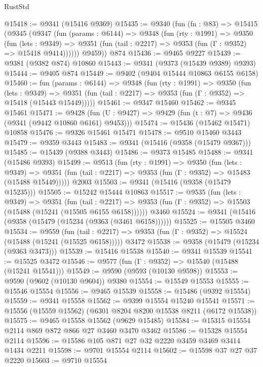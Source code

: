 \begin{lexlean}{RustStd}
\begin{coremodule}
@15418 := @9341 (@15416 @9369)
@15435 := @9340
    (fun (fn : @83) =>
    @15415
      (@9345
        (@9347
          (fun (params : @6144) =>
          @9348
            (fun (rty : @1991) =>
            @9350
              (fun (lets : @9349) =>
              @9351 (fun (tail : @2217) => @9353 (fun (Γ : @9352) => @15418 @9414))))))
        @9459))
    @874
@15436 := @9465 @9227
@15439 := @9381 (@9382 @874) @10860
@15443 := @9341 (@9373 (@15439 @9389) @9393)
@15444 := @9405 @874
@15449 := @9402 (@9404 @15444 @10863 @6155 @6158)
@15460 := fun (params : @6144) =>
  @9348
    (fun (rty : @1991) =>
    @9350
      (fun (lets : @9349) =>
      @9351 (fun (tail : @2217) => @9353 (fun (Γ : @9352) => @15418 (@15443 @15449)))))
@15461 := @9347 @15460
@15462 := @9345 @15461
@15471 := @9428
    (fun (U : @9427) => @9429 (fun (t : @7) => @9436 (@9341 (@9442 @10860 @6161) @9453)))
@15474 := @15436 (@15462 @15471) @10858
@15476 := @9326 @15461 @15471
@15478 := @9510 @15460 @3443
@15479 := @9359 @3443
@15483 := @9341 (@15416 (@9358 (@15479 @9367)))
@15485 := @15439 (@9388 @3443)
@15486 := @9373 @15485
@15488 := @9341 (@15486 @9393)
@15499 := @9513
    (fun (rty : @1991) =>
    @9350
      (fun (lets : @9349) =>
      @9351 (fun (tail : @2217) => @9353 (fun (Γ : @9352) => @15483 (@15488 @15449)))))
    @2003
@15503 := @9341 (@15416 (@9358 (@15479 @15235)))
@15505 := @15242 @15444 @10863
@15517 := @9535
    (fun (lets : @9349) =>
    @9351
      (fun (tail : @2217) =>
      @9353 (fun (Γ : @9352) => @15503 (@15488 (@15241 (@15505 @6155 @6158))))))
    @3460
@15524 := @9341 (@15416 (@9358 (@15479 (@15234 (@9363 (@3461 @6158))))))
@15525 := @15505 @3460
@15534 := @9559
    (fun (tail : @2217) => @9353 (fun (Γ : @9352) => @15524 (@15488 (@15241 (@15525 @6158)))))
    @3472
@15538 := @9358 (@15479 (@15234 (@9363 @3473)))
@15539 := @15416 @15538
@15540 := @9341 @15539
@15541 := @15525 @3472
@15546 := @9577 (fun (Γ : @9352) => @15540 (@15488 (@15241 @15541)))
@15549 := @9590 (@9593 (@10130 @9598))
@15553 := @9590 (@9602 (@10130 @9604)) @9380
@15554 := @15549 @15553
@15555 := @15546 @15554
@15556 := @9465 @15539
@15558 := @15486 (@9392 @15554)
@15559 := @9341 @15558
@15562 := @9399 @15554 @15240 @15541
@15571 := @15556 (@15559 @15562) (@6301 @8204 @8200 @15538 @8211 (@6172 @15538))
@15575 := @9465 @15558 @15562 (@9629 @15485)
@15584 := @15315 @15554 @2114 @869 @872 @866 @27 @3460 @3470 @3462
@15586 := @15328 @15554 @2114
@15596 := @15586 @105 @871 @27 @32 @2220 @3459 @3469 @3414 @1434 @2211
@15598 := @9701 @15554 @2114
@15602 := @15598 @37 @27 @37 @2220
@15603 := @9710 @15554

\end{coremodule}
\end{lexlean}
